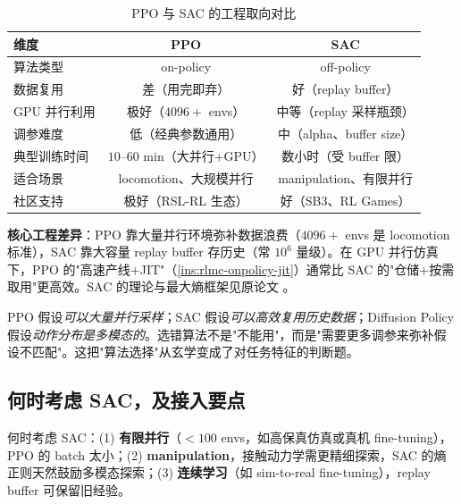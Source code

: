\begin{table}[H]
\centering
\caption{PPO 与 SAC 的工程取向对比}
\label{tab:rlmc-ppo-sac}
\begin{tabular}{lcc}
\hline
维度 & PPO & SAC \\
\hline
算法类型 & on-policy & off-policy \\
数据复用 & 差（用完即弃） & 好（replay buffer） \\
GPU 并行利用 & 极好（$4096+$ envs） & 中等（replay 采样瓶颈） \\
调参难度 & 低（经典参数通用） & 中（alpha、buffer size） \\
典型训练时间 & $10$--$60$ min（大并行+GPU） & 数小时（受 buffer 限） \\
适合场景 & locomotion、大规模并行 & manipulation、有限并行 \\
社区支持 & 极好（RSL-RL 生态） & 好（SB3、RL Games） \\
\hline
\end{tabular}
\end{table}

\textbf{核心工程差异}：PPO 靠大量并行环境弥补数据浪费（$4096+$ envs 是 locomotion 标准），SAC 靠大容量 replay buffer 存历史（常 $10^6$ 量级）。在 GPU 并行仿真下，PPO 的"高速产线+JIT"（\cref{ins:rlmc-onpolicy-jit}）通常比 SAC 的"仓储+按需取用"更高效。SAC 的理论与最大熵框架见原论文 \cite{haarnoja2018sac}。

\begin{insight}\label{ins:rlmc-algo-match}
PPO 假设\emph{可以大量并行采样}；SAC 假设\emph{可以高效复用历史数据}；Diffusion Policy 假设\emph{动作分布是多模态的}。选错算法不是"不能用"，而是"需要更多调参来弥补假设不匹配"。这把"算法选择"从玄学变成了对任务特征的判断题。
\end{insight}

\subsection{何时考虑 SAC，及接入要点}

何时考虑 SAC：(1) \textbf{有限并行}（$<100$ envs，如高保真仿真或真机 fine-tuning），PPO 的 batch 太小；(2) \textbf{manipulation}，接触动力学需更精细探索，SAC 的熵正则天然鼓励多模态探索；(3) \textbf{连续学习}（如 sim-to-real fine-tuning），replay buffer 可保留旧经验。

